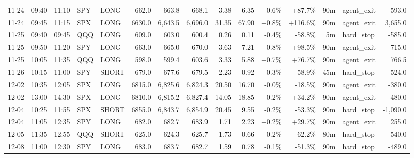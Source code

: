 \documentclass[11pt,a4paper,twoside]{article}
\begin{document}
\begin{landscape}
\begin{center}
\begin{longtable}{>{\color{txtmain}}l l l l l r r r r r r r r >{\color{txtmain}}l r}
11-24 & 09:40 & 11:10 & SPY & LONG & 662.0 & 663.8 & 668.1 & 3.38 & 6.35 & \textcolor{wingreen}{+0.6\%} & \textcolor{wingreen}{+87.7\%} & 90m & agent\_exit & \textcolor{wingreen}{593.0} \\
11-24 & 09:45 & 11:15 & SPX & LONG & 6630.0 & 6,643.5 & 6,696.0 & 31.35 & 67.90 & \textcolor{wingreen}{+0.8\%} & \textcolor{wingreen}{+116.6\%} & 90m & agent\_exit & \textcolor{wingreen}{3,655.0} \\
11-25 & 09:40 & 09:45 & QQQ & LONG & 609.0 & 603.0 & 600.4 & 0.26 & 0.11 & \textcolor{lossred}{-0.4\%} & \textcolor{lossred}{-58.8\%} & 5m & hard\_stop & \textcolor{lossred}{-585.0} \\
11-25 & 09:50 & 11:20 & SPY & LONG & 663.0 & 665.0 & 670.0 & 3.63 & 7.21 & \textcolor{wingreen}{+0.8\%} & \textcolor{wingreen}{+98.5\%} & 90m & agent\_exit & \textcolor{wingreen}{715.0} \\
11-25 & 10:05 & 11:35 & QQQ & LONG & 598.0 & 599.4 & 603.6 & 3.33 & 5.88 & \textcolor{wingreen}{+0.7\%} & \textcolor{wingreen}{+76.7\%} & 90m & agent\_exit & \textcolor{wingreen}{766.5} \\
11-26 & 10:15 & 11:00 & SPY & SHORT & 679.0 & 677.6 & 679.5 & 2.23 & 0.92 & \textcolor{lossred}{-0.3\%} & \textcolor{lossred}{-58.9\%} & 45m & hard\_stop & \textcolor{lossred}{-524.0} \\
12-02 & 10:35 & 12:05 & SPX & LONG & 6815.0 & 6,825.6 & 6,824.3 & 20.50 & 16.70 & \textcolor{lossred}{-0.0\%} & \textcolor{lossred}{-18.5\%} & 90m & agent\_exit & \textcolor{lossred}{-380.0} \\
12-02 & 13:00 & 14:30 & SPX & LONG & 6810.0 & 6,815.2 & 6,827.4 & 14.05 & 18.85 & \textcolor{wingreen}{+0.2\%} & \textcolor{wingreen}{+34.2\%} & 90m & agent\_exit & \textcolor{wingreen}{480.0} \\
12-04 & 10:25 & 11:55 & SPX & SHORT & 6855.0 & 6,843.7 & 6,854.9 & 20.45 & 9.55 & \textcolor{lossred}{-0.2\%} & \textcolor{lossred}{-53.3\%} & 90m & hard\_stop & \textcolor{lossred}{-1,090.0} \\
12-04 & 11:05 & 12:35 & SPY & LONG & 682.0 & 682.7 & 683.9 & 1.71 & 2.23 & \textcolor{wingreen}{+0.2\%} & \textcolor{wingreen}{+29.7\%} & 90m & agent\_exit & \textcolor{wingreen}{255.0} \\
12-05 & 11:35 & 12:55 & QQQ & SHORT & 625.0 & 624.3 & 625.7 & 1.73 & 0.66 & \textcolor{lossred}{-0.2\%} & \textcolor{lossred}{-62.2\%} & 80m & hard\_stop & \textcolor{lossred}{-540.0} \\
12-08 & 11:00 & 12:30 & SPY & LONG & 683.0 & 683.7 & 682.7 & 1.59 & 0.78 & \textcolor{lossred}{-0.1\%} & \textcolor{lossred}{-51.3\%} & 90m & hard\_stop & \textcolor{lossred}{-489.0} \\

\end{longtable}
\end{center}
\end{landscape}
\end{document}
